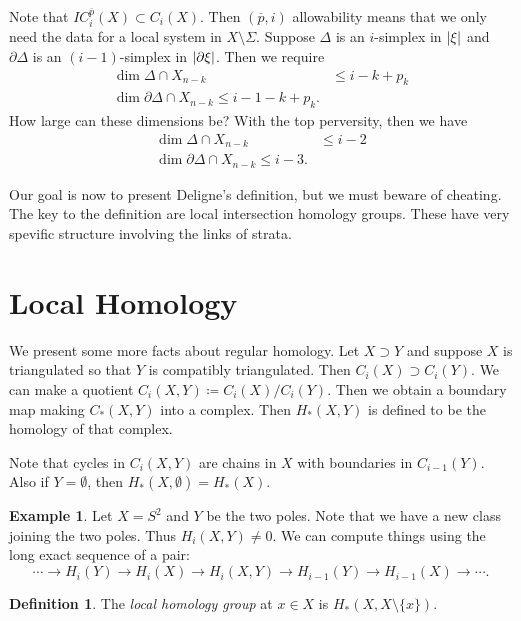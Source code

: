 \documentclass[leqno, openany]{memoir}
\theoremstyle{definition}
\newtheorem{defn}[thm]{Definition}
\newtheorem{exm}[thm]{Example}
\theoremstyle{remark}
\theoremstyle{plain}
\theoremstyle{definition}
\theoremstyle{remark}
\begin{document}
Note that $IC_i^{\overline{p}}(X) \subset C_i(X)$. Then $(\overline{p}, i)$ allowability means that we only need the data for a local system in $X \setminus \Sigma$. Suppose $\Delta$ is an $i$-simplex in $\abs{\xi}$ and $\partial \Delta$ is an $(i-1)$-simplex in $\abs{\partial \xi}$. Then we require
\begin{align*}
    \dim \Delta \cap X_{n-k} & \leq i - k + p_k \\
    \dim \partial \Delta \cap X_{n-k} \leq i - 1 - k + p_k.
\end{align*}
How large can these dimensions be? With the top perversity, then we have
\begin{align*}
    \dim \Delta \cap X_{n-k} & \leq i - 2 \\
    \dim \partial \Delta \cap X_{n-k} \leq i - 3.
\end{align*}

Our goal is now to present Deligne's definition, but we must beware of cheating. The key to the definition are local intersection homology groups. These have very spevific structure involving the links of strata.

\section{Local Homology}%
\label{sec:local_homology}

We present some more facts about regular homology. Let $X \supset Y$ and suppose $X$ is triangulated so that $Y$ is compatibly triangulated. Then $C_i(X) \supset C_i(Y)$. We can make a quotient $C_i(X,Y) \coloneqq C_i(X) / C_i(Y)$. Then we obtain a boundary map making $C_*(X,Y)$ into a complex. Then $H_*(X,Y)$ is defined to be the homology of that complex.

Note that cycles in $C_i(X,Y)$ are chains in $X$ with boundaries in $C_{i-1}(Y)$. Also if $Y = \emptyset$, then $H_*(X, \emptyset) = H_*(X)$.

\begin{exm}
    Let $X = S^2$ and $Y$ be the two poles. Note that we have a new class joining the two poles. Thus $H_i(X,Y) \neq 0$. We can compute things using the long exact sequence of a pair:
    \[ \cdots \to H_i(Y) \to H_i(X) \to H_i(X,Y) \to H_{i-1}(Y) \to H_{i-1}(X) \to \cdots. \]
\end{exm}

\begin{defn}
    The \textit{local homology group} at $x \in X$ is $H_*(X, X \setminus \{x\})$.
\end{defn}
\end{document}
